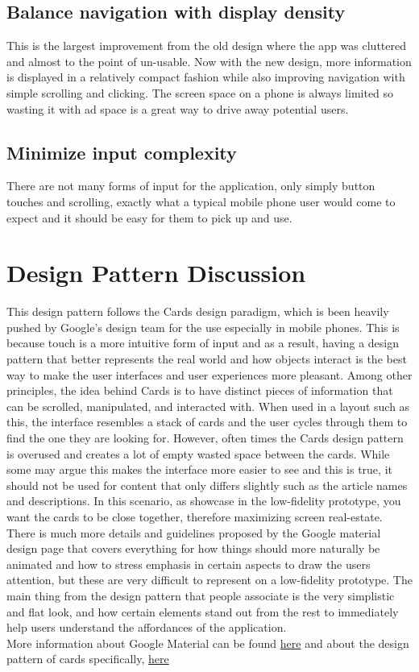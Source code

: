 \documentclass[a4paper, 11pt]{article}
\begin{document}
\subsection*{Balance navigation with display density}
This is the largest improvement from the old design where the app was cluttered and almost to the point of un-usable.  Now with the new design, more information is displayed in a relatively compact fashion while also improving navigation with simple scrolling and clicking.  The screen space on a phone is always limited so wasting it with ad space is a great way to drive away potential users.

\subsection*{Minimize input complexity}
There are not many forms of input for the application, only simply button touches and scrolling, exactly what a typical mobile phone user would come to expect and it should be easy for them to pick up and use.

\section*{Design Pattern Discussion}
This design pattern follows the Cards design paradigm, which is been heavily pushed by Google's design team for the use especially in mobile phones.  This is because touch is a more intuitive form of input and as a result, having a design pattern that better represents the real world and how objects interact is the best way to make the user interfaces and user experiences more pleasant.  Among other principles, the idea behind Cards is to have distinct pieces of information that can be scrolled, manipulated, and interacted with.  When used in a layout such as this, the interface resembles a stack of cards and the user cycles through them to find the one they are looking for.  However, often times the Cards design pattern is overused and creates a lot of empty wasted space between the cards.  While some may argue this makes the interface more easier to see and this is true, it should not be used for content that only differs slightly such as the article names and descriptions.  In this scenario, as showcase in the low-fidelity prototype, you want the cards to be close together, therefore maximizing screen real-estate.\\

There is much more details and guidelines proposed by the Google material design page that covers everything for how things should more naturally be animated and how to stress emphasis in certain aspects to draw the users attention, but these are very difficult to represent on a low-fidelity prototype.  The main thing from the design pattern that people associate is the very simplistic and flat look, and how certain elements stand out from the rest to immediately help users understand the affordances of the application.\\

More information about Google Material can be found \href{https://material.google.com/#introduction-principles}{here} and about the design pattern of cards specifically, \href{https://material.google.com/components/cards.html}{here}
\end{document}
